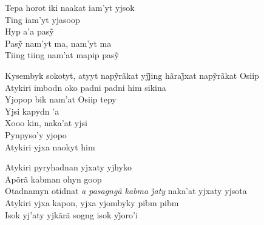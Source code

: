  \smallskip
 \begin{center}\end{center}
 \smallskip
 
\noindent   Tepa horot iki naakat iam'yt yjsok\\
  Ting iam'yt yjasoop\\
  Hyp a’a pasỹ\\
  Pasỹ nam’yt ma, nam’yt ma\\
  Tiing tiing nam’at mapip pasỹ
 
 \smallskip
 \begin{center}\end{center}
 \smallskip
 
\noindent   Kysembyk sokotyt, atyyt napỹrãkat yjj̃ing hãraj̃xat napỹrãkat Osiip\\
  Atykiri imbodn oko padni padni him sikina\\
  Yjopop bik nam'at Osiip tepy\\
  Yjsi kapydn 'a\\
  Xooo kin, naka'at yjsi\\
  Pynpyso'y yjopo\\
  Atykiri yjxa naokyt him
 
 \smallskip
 \begin{center}\end{center}
 \smallskip
 
\noindent   Atykiri pyryhadnan yjxaty yjhyko\\
  Apõrã kabman ohyn goop\\
  Otadnamyn otidnat \textit{a pasagngã kabma j̃aty} naka’at yjxaty yjsota\\
  Atykiri yjxa kapon, yjxa yjombyky pibm pibm\\
  Isok yj’aty yjkãrã sogng isok yj̃oro’i
 
